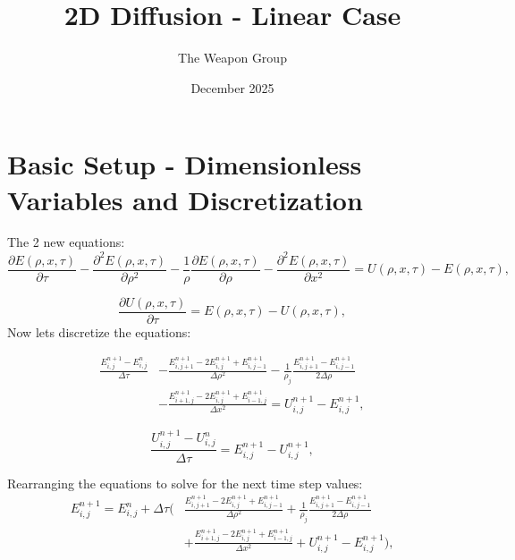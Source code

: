 \documentclass{article}
\title{2D Diffusion - Linear Case}
\author{The Weapon Group}
\date{December 2025}
\begin{document}
\maketitle

\section{Basic Setup - Dimensionless Variables and Discretization}
The 2 new equations:
\begin{equation}
\frac{\partial E(\rho, x,\tau)}{\partial \tau} - \frac{\partial^2E(\rho, x,\tau)}{\partial \rho^2} - \frac{1}{\rho}\frac{\partial E(\rho, x,\tau)}{\partial \rho} - \frac{\partial^2E( \rho, x,\tau)}{\partial x^2} = U(\rho, x,\tau) - E(\rho, x,\tau),
\end{equation}

\begin{equation}
\frac{\partial U(\rho, x,\tau)}{\partial \tau} = E(\rho, x,\tau) - U(\rho, x,\tau),
\end{equation}
Now lets discretize the equations:

\begin{equation}
\begin{split}
\frac{E^{n+1}_{i,j}-E^{n}_{i,j}}{\Delta \tau} & - \frac{E^{n+1}_{i,j+1}-2E^{n+1}_{i,j}+E^{n+1}_{i,j-1}}{\Delta \rho^2} 
- \frac{1}{\rho_j}\frac{E^{n+1}_{i,j+1}-E^{n+1}_{i,j-1}}{2\Delta \rho} \\
& - \frac{E^{n+1}_{i+1,j}-2E^{n+1}_{i,j}+E^{n+1}_{i-1,j}}{\Delta x^2} = U^{n+1}_{i,j} - E^{n+1}_{i,j},
\end{split}
\end{equation}

\begin{equation}
\frac{U^{n+1}_{i,j}-U^{n}_{i,j}}{\Delta \tau} = E^{n+1}_{i,j} - U^{n+1}_{i,j},
\end{equation}

Rearranging the equations to solve for the next time step values:
\begin{equation}
\begin{split}
E^{n+1}_{i,j} = E^{n}_{i,j} + \Delta \tau \Biggl( & \frac{E^{n+1}_{i,j+1}-2E^{n+1}_{i,j}+E^{n+1}_{i,j-1}}{\Delta \rho^2} 
+ \frac{1}{\rho_j}\frac{E^{n+1}_{i,j+1}-E^{n+1}_{i,j-1}}{2\Delta \rho} \\
& + \frac{E^{n+1}_{i+1,j}-2E^{n+1}_{i,j}+E^{n+1}_{i-1,j}}{\Delta x^2} + U^{n+1}_{i,j} - E^{n+1}_{i,j} \Biggr),
\end{split}
\end{equation}
\end{document}

